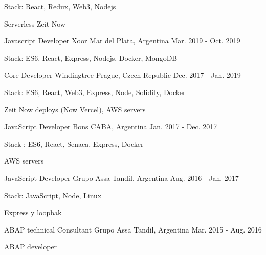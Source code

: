 \begin{cventries}
{ %
\begin{cvitems}
\item {Stack: React, Redux, Web3, Nodejs}
\item {Serverless Zeit Now}
\end{cvitems}
}
\cventry
{Javascript Developer} %
{Xoor} %
{Mar del Plata, Argentina} %
{Mar. 2019 - Oct. 2019} %
{ %
\begin{cvitems}
\item {Stack: ES6, React, Express, Nodejs, Docker, MongoDB}
\end{cvitems}
}
\cventry
{Core Developer} %
{Windingtree} %
{Prague, Czech Republic} %
{Dec. 2017 - Jan. 2019} %
{ %
\begin{cvitems}
\item {Stack: ES6, React, Web3, Express, Node, Solidity, Docker}
\item {Zeit Now deploys (Now Vercel), AWS servers}
\end{cvitems}
}
\cventry
{JavaScript Developer} %
{Bons} %
{CABA, Argentina} %
{Jan. 2017 - Dec. 2017} %
{ %
\begin{cvitems}
\item {Stack : ES6, React, Senaca, Express, Docker}
\item {AWS servers}
\end{cvitems}
}
\cventry
{JavaScript Developer} %
{Grupo Assa} %
{Tandil, Argentina} %
{Aug. 2016 - Jan. 2017} %
{ %
\begin{cvitems}
\item {Stack: JavaScript, Node, Linux}
\item {Express y loopbak}
\end{cvitems}
}

\cventry
{ABAP technical Consultant} %
{Grupo Assa} %
{Tandil, Argentina} %
{Mar. 2015 - Aug. 2016} %
{ %
\begin{cvitems}
\item {ABAP developer}
\end{cvitems}
}

\end{cventries}
